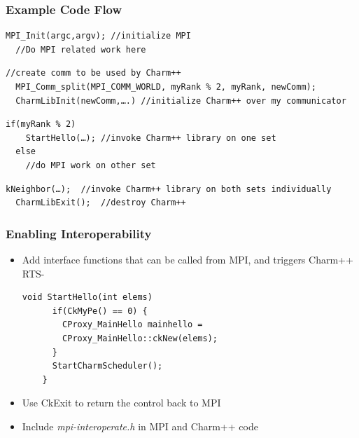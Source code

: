 \begin{frame}[fragile]
  \frametitle{Example Code Flow}
  \begin{lstlisting}[basicstyle=\footnotesize]
  MPI_Init(argc,argv); //initialize MPI
  //Do MPI related work here
  \end{lstlisting}
  \pause
  \begin{lstlisting}[basicstyle=\footnotesize]
  //create comm to be used by Charm++
  MPI_Comm_split(MPI_COMM_WORLD, myRank % 2, myRank, newComm); 
  CharmLibInit(newComm,….) //initialize Charm++ over my communicator
  \end{lstlisting}
  \pause
  \begin{lstlisting}[basicstyle=\footnotesize]
  if(myRank % 2) 
    StartHello(…); //invoke Charm++ library on one set
  else 
    //do MPI work on other set
  \end{lstlisting}
  \pause
  \begin{lstlisting}[basicstyle=\footnotesize]
  kNeighbor(…);  //invoke Charm++ library on both sets individually
  CharmLibExit();  //destroy Charm++ 
  \end{lstlisting}
\end{frame}

\begin{frame}[fragile]

  \frametitle{Enabling Interoperability}

  \begin{itemize}
    \item Add interface functions that can be called from MPI, and triggers
    Charm++ RTS-
    \begin{lstlisting}[basicstyle=\footnotesize]
    void StartHello(int elems)
      if(CkMyPe() == 0) {
        CProxy_MainHello mainhello =
        CProxy_MainHello::ckNew(elems); 
      }
      StartCharmScheduler();
    }
    \end{lstlisting}
  \pause
  \item Use CkExit to return the control back to MPI
  \item Include {\em mpi-interoperate.h} in MPI and Charm++ code
  \end{itemize}
\end{frame}



